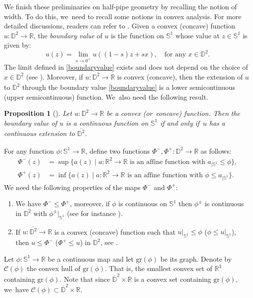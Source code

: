 \documentclass[JEP,XML,SOM,Unicode,NoEqCountersInSection, NoFloatCountersInSection,published]{cedram}
\let\ra\rightarrow
\theoremstyle{plain}
\newtheorem{prop}[cor]{Proposition}
\theoremstyle{definition}
\begin{document}
We finish these preliminaries on half-pipe geometry by recalling the notion of width. To do this, we~need to recall some notions in convex analysis. For more detailed discussions, readers can refer to \cite{Rockconvex}.
Given a convex (\resp concave) function $u:\mathbb{D}^2\to \mathbb{R}$, the \emph{boundary value} of $u$ is the function on $\mathbb{S}^1$ whose value at $z\in\mathbb{S}^1$ is given by: \begin{equation}\label{boundaryvalue}
u(z) = \lim_{s \to 0^+}u((1-s)z+sx),\quad\text{for any } x\in\mathbb{D}^2.
\end{equation}
The limit defined in \eqref{boundaryvalue} exists and does not depend on the choice of $x\in \mathbb{D}^2$ (see \cite[\S 4]{ConvexAnal}). Moreover, if $u:\mathbb{D}^2\to\mathbb{R}$ is convex (\resp concave), then the extension of $u$ to $\overline{\mathbb{D}^2}$ through the boundary value \eqref{boundaryvalue} is a lower semicontinuous (\resp upper semicontinuous) function. We~also need the following result.
\begin{prop}[{\cite[Prop.\,4.2]{ConvexAnal}}]
\label{boundaryvalueextension}
Let $u: \mathbb{D}^2\to\mathbb{R}$ be a convex (or~concave) function. Then the boundary value of $u$ is a continuous function on $\mathbb{S}^1$ if and only if~$u$ has a continuous extension to $\overline{\mathbb{D}^2}$.
\end{prop}
For any function $\phi: \mathbb{S}^1 \to \mathbb{R}$, define two functions $\Phi^-, \Phi^+: \overline{\mathbb{D}^2} \to \mathbb{R}$ as follows:\vspace*{-3pt}
\begin{align}\label{phi-}
\Phi^-(z)&=\sup\{ a(z)\mid a:\mathbb{R}^2\ra\mathbb{R} \text{ is an affine function with } a_{\mid\mathbb{S}^1}\leq\phi \},
\\
\label{phi+}
\Phi^+(z)&=\inf\{ a(z)\mid a:\mathbb{R}^2\ra\mathbb{R} \text{ is an affine function with } \phi\leq a_{\mid\mathbb{S}^1} \}.
\end{align}
We need the following properties of the maps $\Phi^-$ and $\Phi^+$:\label{page 8}
\begin{enumerate}
\item[(P1)]\label{P1}
We have $\Phi^-\leq\Phi^+$, moreover, if $\phi$ is continuous on $\mathbb{S}^1$ then $\phi^{\pm}$ is continuous in $\mathbb{D}^2$ with $\phi^{\pm}|_{\mathbb{S}^1}$ (see for instance \cite[Lem.\,4.6]{ConvexAnal}).
\item[(P2)]\label{P2} If $u:\overline{\mathbb{D}^2}\to\mathbb{R}$ is a convex (\resp concave) function such that $u |_{\mathbb{S}^1}\leq \phi$ (\resp $\phi\leq u |_{\mathbb{S}^1} $), then $u\leq\Phi^-$ (\resp $\Phi^+\leq u$) in $\mathbb{D}^2$, see \cite[Cor.\,4.5]{ConvexAnal}.
\end{enumerate}
Let $\phi:\mathbb{S}^1\to\mathbb{R}$ be a continuous map and let $\mathrm{gr}(\phi)$ be its graph. Denote by $\mathcal{C}(\phi)$ the convex hull of $\mathrm{gr}(\phi)$. That is, the smallest convex set of $\mathbb{R}^3$ containing $\mathrm{gr}(\phi)$. Note that since $\overline{\mathbb{D}}^2\times\mathbb{R}$ is a convex set containing $\mathrm{gr}(\phi)$, we~have $\mathcal{C}(\phi)\subset\overline{\mathbb{D}}^2\times\mathbb{R}$.
\end{document}
